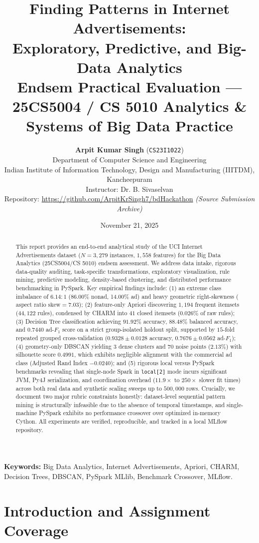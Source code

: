 \documentclass[11pt,a4paper]{article}
\title{\textbf{\Large Finding Patterns in Internet Advertisements:\\Exploratory, Predictive, and Big-Data Analytics}\\[0.3em]
\large Endsem Practical Evaluation --- 25CS5004 / CS 5010 Analytics \& Systems of Big Data Practice}
\author{\textbf{Arpit Kumar Singh} \quad (\texttt{CS23I1022})\\
Department of Computer Science and Engineering\\
Indian Institute of Information Technology, Design and Manufacturing (IIITDM), Kancheepuram\\
\small Instructor: Dr. B. Sivaselvan\\
\small Repository: \url{https://github.com/ArpitKrSingh7/bdHackathon} \textit{(Source Submission Archive)}}
\date{November 21, 2025}
\begin{document}
\maketitle

\begin{abstract}
This report provides an end-to-end analytical study of the UCI Internet Advertisements dataset ($N = 3{,}279$ instances, $1{,}558$ features) for the Big Data Analytics (25CS5004/CS 5010) endsem assessment. We address data intake, rigorous data-quality auditing, task-specific transformations, exploratory visualization, rule mining, predictive modeling, density-based clustering, and distributed performance benchmarking in PySpark. 
Key empirical findings include: (1) an extreme class imbalance of $6.14:1$ (86.00\% nonad, 14.00\% ad) and heavy geometric right-skewness ($\text{aspect ratio skew} = 7.03$); (2) feature-only Apriori discovering $1{,}194$ frequent itemsets ($44{,}122$ rules), condensed by CHARM into $41$ closed itemsets ($0.026\%$ of raw rules); (3) Decision Tree classification achieving $91.92\%$ accuracy, $88.48\%$ balanced accuracy, and $0.7440$ ad-$F_1$ score on a strict group-isolated holdout split, supported by $15$-fold repeated grouped cross-validation ($0.9328 \pm 0.0128$ accuracy, $0.7676 \pm 0.0562$ ad-$F_1$); (4) geometry-only DBSCAN yielding 3 dense clusters and 70 noise points ($2.13\%$) with silhouette score $0.4991$, which exhibits negligible alignment with the commercial ad class (Adjusted Rand Index $-0.0240$); and (5) rigorous local versus PySpark benchmarks revealing that single-node Spark in \texttt{local[2]} mode incurs significant JVM, Py4J serialization, and coordination overhead ($11.9\times$ to $250\times$ slower fit times) across both real data and synthetic scaling sweeps up to $500{,}000$ rows. Crucially, we document two major rubric constraints honestly: dataset-level sequential pattern mining is structurally infeasible due to the absence of temporal timestamps, and single-machine PySpark exhibits no performance crossover over optimized in-memory Cython. All experiments are verified, reproducible, and tracked in a local MLflow repository.
\end{abstract}

\vspace{0.5em}
\noindent\textbf{Keywords:} Big Data Analytics, Internet Advertisements, Apriori, CHARM, Decision Trees, DBSCAN, PySpark MLlib, Benchmark Crossover, MLflow.

\section{Introduction and Assignment Coverage}
\label{sec:intro}
\end{document}
